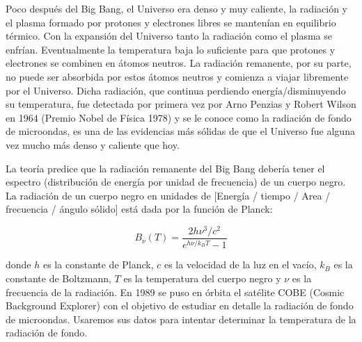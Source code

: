 \documentclass[letter, 11pt]{article}
\begin{document}
\vspace{1.5em}

Poco después del Big Bang, el Universo era denso y muy caliente, la radiación y
el plasma formado por protones y electrones libres se mantenían en equilibrio
térmico. Con la expansión del Universo tanto la radiación como el plasma se
enfrían. Eventualmente la temperatura baja lo suficiente para que protones y
electrones se combinen en átomos neutros. La radiación remanente, por su parte,
no puede ser absorbida por estos átomos neutros y comienza a viajar libremente
por el Universo. Dicha radiación, que continua perdiendo energía/disminuyendo
su temperatura, fue detectada por primera vez por Arno Penzias y Robert Wilson
en 1964 (Premio Nobel de Física 1978) y se le conoce como la radiación de fondo
de microondas, es una de las evidencias más sólidas de que el Universo fue
alguna vez mucho más denso y caliente que hoy.

La teoría predice que la radiación remanente del Big Bang debería tener el
espectro (distribución de energía por unidad de frecuencia) de un cuerpo negro.
La radiación de un cuerpo negro en unidades de [Energía / tiempo / Area /
frecuencia / ángulo sólido] está dada por la función de Planck:

$$B_\nu(T) = \frac{2 h \nu^3 / c^2}{e^{h\nu/k_BT} - 1} $$

donde $h$ es la constante de Planck, $c$ es la velocidad de la luz en el vacío,
$k_B$ es la constante de Boltzmann, $T$ es la temperatura del cuerpo negro y
$\nu$ es la frecuencia de la radiación. En 1989 se puso en órbita el satélite
COBE (Cosmic Background Explorer) con el objetivo de estudiar en detalle la
radiación de fondo de microondas. Usaremos sus datos para intentar determinar
la temperatura de la radiación de fondo.
\end{document}
